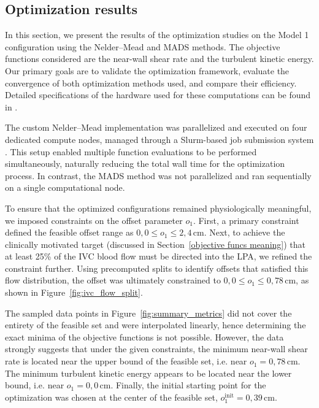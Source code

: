 \newpage
\subsection{Optimization results}  
In this section, we present the results of the optimization studies on the Model 1 configuration using the Nelder--Mead and MADS methods. The objective functions considered are the near-wall shear rate and the turbulent kinetic energy. Our primary goals are to validate the optimization framework, evaluate the convergence of both optimization methods used, and compare their efficiency. Detailed specifications of the hardware used for these computations can be found in \cite{gpu}.

The custom Nelder--Mead implementation was parallelized and executed on four dedicated compute nodes, managed through a Slurm-based job submission system \cite{slurm}. This setup enabled multiple function evaluations to be performed simultaneously, naturally reducing the total wall time for the optimization process. In contrast, the MADS method was not parallelized and ran sequentially on a single computational node.

To ensure that the optimized configurations remained physiologically meaningful, we imposed constraints on the offset parameter \(o_1\). First, a primary constraint defined the feasible offset range as \(0{,}0 \leq o_1 \leq 2{,}4\,\text{cm}\). Next, to achieve the clinically motivated target (discussed in Section~\ref{objective funcs meaning}) that at least 25\% of the IVC blood flow must be directed into the LPA, we refined the constraint further. Using precomputed splits to identify offsets that satisfied this flow distribution, the offset was ultimately constrained to \(0{,}0 \leq o_1 \leq 0{,}78\,\text{cm}\), as shown in Figure~\ref{fig:ivc_flow_split}.

The sampled data points in Figure~\ref{fig:summary_metrics} did not cover the entirety of the feasible set and were interpolated linearly, hence determining the exact minima of the objective functions is not possible. However, the data strongly suggests that under the given constraints, the minimum near-wall shear rate is located near the upper bound of the feasible set, i.e. near \(o_1 = 0{,}78\,\text{cm}\). The minimum turbulent kinetic energy appears to be located near the lower bound, i.e. near \(o_1 = 0{,}0\,\text{cm}\). Finally, the initial starting point for the optimization was chosen at the center of the feasible set, \(o_1^\text{init} = 0{,}39\,\text{cm}\). 


